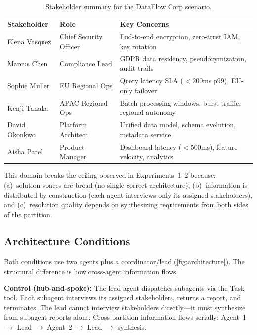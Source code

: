 \documentclass[11pt,letterpaper]{article}
\begin{document}
\begin{table}[t]
  \caption{Stakeholder summary for the DataFlow Corp scenario.}
  \label{tab:stakeholders}
  \centering\small
  \begin{tabularx}{\textwidth}{llX}
    \toprule
    \textbf{Stakeholder} & \textbf{Role} & \textbf{Key Concerns} \\
    \midrule
    Elena Vasquez   & Chief Security Officer  & End-to-end encryption, zero-trust IAM, key rotation \\
    Marcus Chen     & Compliance Lead         & GDPR data residency, pseudonymization, audit trails \\
    Sophie Muller   & EU Regional Ops         & Query latency SLA ($<$200ms p99), EU-only failover \\
    Kenji Tanaka    & APAC Regional Ops       & Batch processing windows, burst traffic, regional autonomy \\
    David Okonkwo   & Platform Architect      & Unified data model, schema evolution, metadata service \\
    Aisha Patel     & Product Manager         & Dashboard latency ($<$500ms), feature velocity, analytics \\
    \bottomrule
  \end{tabularx}
\end{table}

This domain breaks the ceiling observed in Experiments~1--2 because:
(a)~solution spaces are broad (no single correct architecture),
(b)~information is distributed by construction (each agent interviews
only its assigned stakeholders), and (c)~resolution quality depends on
synthesizing requirements from both sides of the partition.

\subsection{Architecture Conditions}
\label{sec:arch-conditions}

Both conditions use two agents plus a coordinator/lead
(\cref{fig:architecture}). The structural difference is how
cross-agent information flows.

\textbf{Control (hub-and-spoke):} The lead agent dispatches subagents
via the Task tool. Each subagent interviews its assigned stakeholders,
returns a report, and terminates. The lead cannot interview stakeholders
directly---it must synthesize from subagent reports alone. Cross-partition
information flows serially: Agent~1 $\to$ Lead $\to$ Agent~2 $\to$
Lead $\to$ synthesis.
\end{document}
